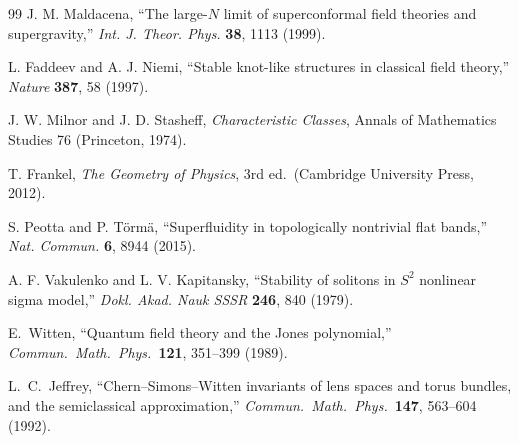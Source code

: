 \documentclass[11pt,letterpaper]{article}
\begin{document}
\begin{thebibliography}{99}
J. M. Maldacena, ``The large-$N$ limit of superconformal field theories and supergravity,'' \textit{Int. J. Theor. Phys.} \textbf{38}, 1113 (1999).

L. Faddeev and A. J. Niemi, ``Stable knot-like structures in classical field theory,'' \textit{Nature} \textbf{387}, 58 (1997).

J. W. Milnor and J. D. Stasheff, \textit{Characteristic Classes}, Annals of Mathematics Studies 76 (Princeton, 1974).

T. Frankel, \textit{The Geometry of Physics}, 3rd ed.\ (Cambridge University Press, 2012).

S. Peotta and P. Törmä, ``Superfluidity in topologically nontrivial flat bands,'' \textit{Nat. Commun.} \textbf{6}, 8944 (2015).

A. F. Vakulenko and L. V. Kapitansky, ``Stability of solitons in $S^2$ nonlinear sigma model,'' \textit{Dokl. Akad. Nauk SSSR} \textbf{246}, 840 (1979).

E.~Witten, ``Quantum field theory and the Jones polynomial,'' \textit{Commun.\ Math.\ Phys.}\ \textbf{121}, 351--399 (1989).

L.~C.~Jeffrey, ``Chern--Simons--Witten invariants of lens spaces and torus bundles, and the semiclassical approximation,'' \textit{Commun.\ Math.\ Phys.}\ \textbf{147}, 563--604 (1992).

\end{thebibliography}
\end{document}
